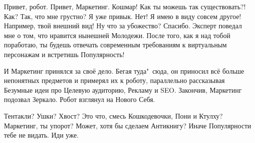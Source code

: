 {\small \begin{dialog}
\X Привет, робот.
\R Привет, Маркетинг.
\X Кошмар! Как ты можешь так существовать?!
\R Как? Так, что мне грустно? Я уже привык.
\X Нет! Я имею в виду совсем другое! Например, твой внешний вид! Ну что за убожество?
\R Спасибо.
\X Эксперт поведал мне о том, что нравится нынешней Молодежи. После того, как я над тобой поработаю, ты будешь отвечать современным требованиям к виртуальным персонажам и встретишь Популярность! 
\end{dialog}

\begin{monolog}
И Маркетинг принялся за своё дело. Бегая туда"~сюда, он приносил всё больше непонятных предметов и примерял их к роботу, параллельно рассказывая Безумные идеи про Целевую аудиторию, Рекламу и SEO. Закончив, Маркетинг подозвал Зеркало. Робот взглянул на Нового Себя.
\end{monolog}

\begin{dialog}
\R Тентакли? Ушки? Хвост? Это что, смесь Кошкодевочки, Пони и Ктулху? Маркетинг, ты упорот?
\X Может, хотя бы сделаем Антикнигу? Иначе Популярности тебе не видать.
\R Иди уже.
\end{dialog}
}